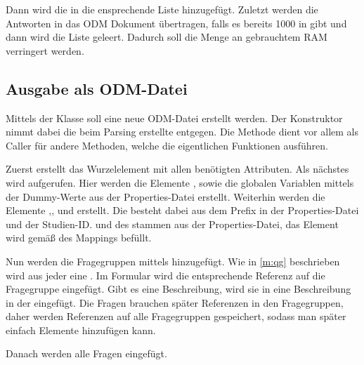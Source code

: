 Dann wird die  in die ensprechende Liste hinzugefügt.
Zuletzt werden die Antworten in das ODM Dokument übertragen, falls es bereits 1000 in  gibt und dann wird die Liste geleert.
Dadurch soll die Menge an gebrauchtem RAM verringert werden.

\subsection{Ausgabe als ODM-Datei}

Mittels der Klasse  soll eine neue ODM-Datei erstellt werden. Der Konstruktor nimmt dabei die beim Parsing erstellte  entgegen.
Die Methode  dient vor allem als Caller für andere Methoden, welche die eigentlichen Funktionen ausführen.

Zuerst erstellt  das Wurzelelement  mit allen benötigten Attributen.
Als nächstes wird  aufgerufen. Hier werden die Elemente , sowie die globalen Variablen mittels der Dummy-Werte aus der Properties-Datei erstellt.
Weiterhin werden die Elemente ,,  und  erstellt.
Die  besteht dabei aus dem Prefix in der Properties-Datei und der Studien-ID.
 und  des  stammen aus der Properties-Datei, das Element  wird gemäß des Mappings befüllt.

Nun werden die Fragegruppen mittels  hinzugefügt. Wie in \cref{m:qg} beschrieben wird aus jeder  eine .
Im Formular wird die entsprechende Referenz auf die Fragegruppe eingefügt.
Gibt es eine Beschreibung, wird sie in eine Beschreibung in der  eingefügt.
Die Fragen brauchen später Referenzen in den Fragegruppen, daher werden Referenzen auf alle Fragegruppen gespeichert, sodass man später einfach Elemente hinzufügen kann.

Danach werden alle Fragen eingefügt.


